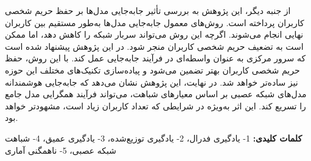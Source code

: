 \begin{small}
از جنبه دیگر، این پژوهش به بررسی تأثیر جابه‌جایی مدل‌ها بر حفظ حریم شخصی کاربران پرداخته است. روش‌های معمول جابه‌جایی مدل‌ها به‌طور مستقیم بین کاربران نهایی انجام می‌شوند. اگرچه این روش می‌تواند سربار شبکه را کاهش دهد، اما ممکن است به تضعیف حریم شخصی کاربران منجر شود. در این پژوهش پیشنهاد شده است که سرور مرکزی به عنوان واسطه‌ای در فرآیند جابه‌جایی عمل کند. با این روش، حفظ حریم شخصی کاربران بهتر تضمین می‌شود و پیاده‌سازی تکنیک‌های مختلف این حوزه نیز ساده‌تر خواهد شد.
در نهایت، این پژوهش نشان می‌دهد که جابه‌جایی هوشمندانه مدل‌های شبکه عصبی بر اساس معیارهای شباهت، می‌تواند فرآیند همگرایی مدل جامع را تسریع کند. این اثر به‌ویژه در شرایطی که تعداد کاربران زیاد است، مشهودتر خواهد بود.



\vspace{5mm}
\noindent\textbf{کلمات کلیدی:}
1- یادگیری فدرال،
2- یادگیری توزیع‌شده،
3- یادگیری عمیق،
4- شباهت شبکه عصبی،
5- ناهمگنی آماری
\end{small}